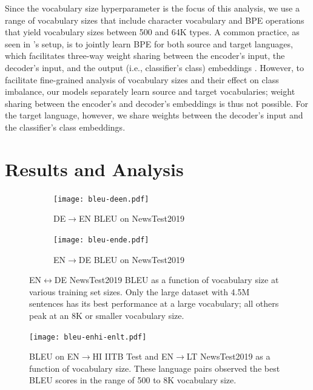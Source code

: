 Since the vocabulary size hyperparameter is the focus of this analysis, we use a range of vocabulary sizes that include character vocabulary and BPE operations that yield vocabulary sizes between 500 and 64K types.
A common practice, as seen in \citet{vaswani-2017-attention}'s setup, is to jointly learn BPE for both source and target languages, which facilitates three-way weight sharing between the encoder's input, the decoder's input, and the output (i.e., classifier's class) embeddings \cite{press-wolf-2017-embeddings}.
However, to facilitate fine-grained analysis of vocabulary sizes and their effect on class imbalance, our models separately learn source and target vocabularies; weight sharing between the encoder's and decoder's embeddings is thus not possible.
For the target language, however, we share weights between the decoder's input and the classifier's class embeddings.

\section{Results and Analysis}
\label{sec:nmt_analysis}

\begin{figure}[h!t]
\centering
\begin{subfigure}{\linewidth}
    \centering
    \texttt{[image: bleu-deen.pdf]}
    \caption{DE$\rightarrow$EN BLEU on NewsTest2019}
    \label{fig:bleu-deen}
\end{subfigure}

\vspace{5mm}

\begin{subfigure}{\linewidth}
    \centering
    \texttt{[image: bleu-ende.pdf]}
    \caption{EN$\rightarrow$DE BLEU on NewsTest2019}
    \label{fig:bleu-ende}
\end{subfigure}
\caption{EN$\leftrightarrow$DE NewsTest2019 BLEU as a function of vocabulary size at various training set sizes. 
Only the large dataset with 4.5M sentences has its best performance at a large vocabulary; all others peak at an 8K or smaller vocabulary size.}
\label{fig:bleu-ende-deen}
\end{figure}

\begin{figure}[ht]
    \centering    
    \texttt{[image: bleu-enhi-enlt.pdf]}
    \caption{BLEU on EN$\rightarrow$HI IITB Test and EN$\rightarrow$LT NewsTest2019 as a function of vocabulary size.
    These language pairs observed the best BLEU scores in the range of 500 to 8K vocabulary size.}
    \label{fig:bleu-enhilt}
\end{figure}

